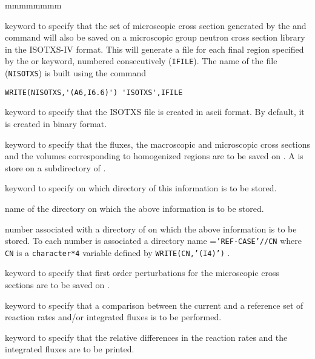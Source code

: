 \begin{ListeDeDescription}{mmmmmmmm}
\item[\moc{ISOTXS}] keyword to specify that the set of microscopic cross
section generated by the  and  command will also
be saved on a microscopic group neutron cross section library in the ISOTXS-IV
format. This will generate a file for each final region specified by the
 or  keyword, numbered consecutively ({\tt IFILE}). The name
of the file ({\tt NISOTXS}) is built using the command 

\begin{verbatim}
WRITE(NISOTXS,'(A6,I6.6)') 'ISOTXS',IFILE
\end{verbatim}

\item[\moc{ASCII}] keyword to specify that the ISOTXS file is created in ascii format.
By  default, it is created in binary format.

\item[\moc{SAVE}] keyword to specify that the fluxes, the macroscopic and
microscopic cross sections and the volumes corresponding to homogenized regions
are to be saved on . A  is store on a subdirectory
of .

\item[\moc{ON}] keyword to specify on which directory of  this
information is to be stored.

\item[\dusa{DIRN}] name of the directory on which the above information is to
be stored.

\item[\dusa{idirn}] number associated with a directory of  on
which the above information is to be stored. To each number  is
associated a directory name ={\tt 'REF-CASE'//CN} where {\tt CN} is a
{\tt character*4} variable defined by {\tt WRITE(CN,'(I4)')} .

\item[\moc{PERT}] keyword to specify that first order perturbations for 
the microscopic cross sections are to be saved on . 

\item[\moc{STAT}] keyword to specify that a comparison between the current and
a reference set of reaction rates and/or integrated fluxes is to be performed. 

\item[\moc{ALL}] keyword to specify that the relative differences in the
reaction rates and the integrated fluxes are to be printed.


\end{ListeDeDescription}
